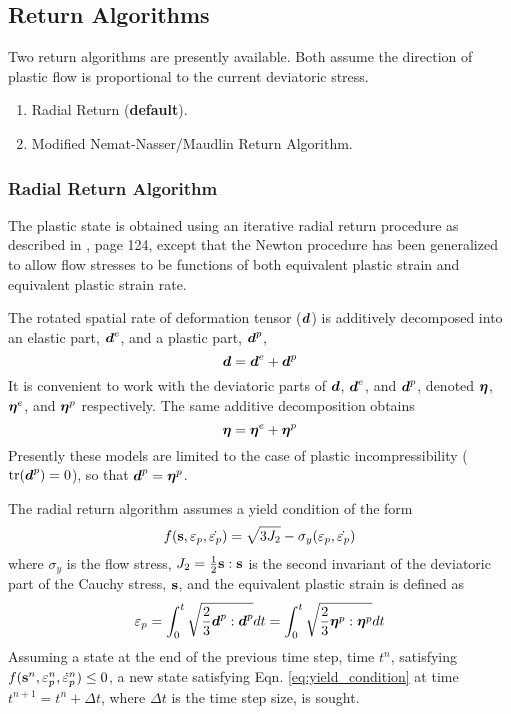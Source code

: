 \subsection{Return Algorithms}

Two return algorithms are presently available.  Both assume the direction
of plastic flow is proportional to the current deviatoric stress.
  \begin{enumerate}
    \item Radial Return ({\bf default}).
    \item Modified Nemat-Nasser/Maudlin Return Algorithm.
  \end{enumerate}

\subsubsection{Radial Return Algorithm}
The plastic state is obtained using an iterative radial return
procedure as described in \cite{Simo98}, page 124, except that the
Newton procedure has been generalized to allow flow stresses to be
functions of both equivalent plastic strain and equivalent plastic
strain rate.

The rotated spatial rate of deformation tensor ($\boldsymbol{d}$) is additively
decomposed into an elastic part, $\boldsymbol{d}^e$, and a plastic part, $\boldsymbol{d}^p$,
  \begin{equation}
     \boldsymbol{d} = \boldsymbol{d}^e + \boldsymbol{d}^p
  \end{equation}
  It is convenient to work with the deviatoric parts of $\boldsymbol{d}$,
  $\boldsymbol{d}^e$, and $\boldsymbol{d}^p$, denoted $\boldsymbol{\eta}$, $\boldsymbol{\eta}^e$, and
  $\boldsymbol{\eta}^p$ respectively. The same additive decomposition obtains
  \begin{equation}
     \boldsymbol{\eta} = \boldsymbol{\eta}^e + \boldsymbol{\eta}^p
  \end{equation}
  Presently these models are limited to the case of plastic
  incompressibility ($\text{tr}{(\ensuremath{\boldsymbol{d}}^p)} = 0$), so that $\boldsymbol{d}^p=\boldsymbol{\eta}^p$.

The radial return algorithm assumes a yield condition of the form 
  \begin{equation}\label{eq:yield_condition}
    f(\mathbf{s},\varepsilon_p,\dot{\varepsilon_p}) = \sqrt{3J_2} - \sigma_y(\varepsilon_p,\dot{\varepsilon_p})
  \end{equation}
where $\sigma_y$ is the flow stress, $J_2 = {1\over2}\mathbf{s}:\mathbf{s}$ is the
second invariant of the deviatoric part of the Cauchy stress, $\mathbf{s}$,
and the equivalent plastic strain is defined as
  \begin{equation}\label{eq:ep}
    \varepsilon_p = \int_0^t\sqrt{{2\over3}\boldsymbol{d}^p:\boldsymbol{d}^p}dt = \int_0^t\sqrt{{2\over3}\boldsymbol{\eta}^p:\boldsymbol{\eta}^p}dt
  \end{equation}
Assuming a state at the end of the previous time step, time $t^n$,
satisfying $f(\mathbf{s}^n,\varepsilon_p^n,\dot{\varepsilon}_{p}^n)\le0$, a new state satisfying
Eqn. \ref{eq:yield_condition} at time $t^{n+1}=t^n+\Delta t$, where
$\Delta t$ is the time step size, is sought.

